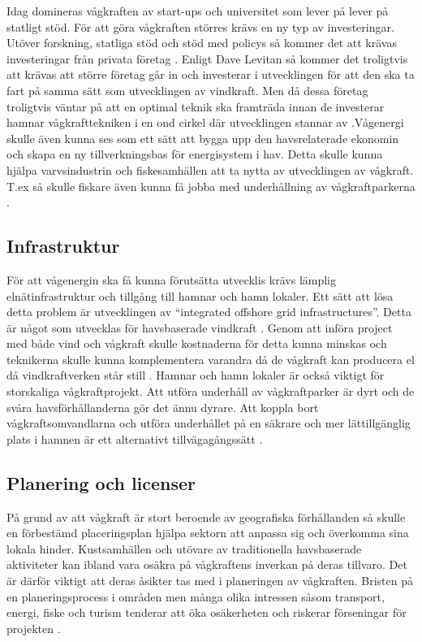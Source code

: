 \documentclass[10pt,a4paper,oneside]{article}
\begin{document}
Idag domineras vågkraften av start-ups och universitet som lever på lever på statligt stöd. För att göra vågkraften störres krävs en ny typ av investeringar. Utöver forskning, statliga stöd och stöd med policys så kommer det att krävas investeringar från privata företag \cite{IRENA}. Enligt Dave Levitan så kommer det troligtvis att krävas att större företag går in och investerar i utvecklingen för att den ska ta fart på samma sätt som utvecklingen av vindkraft. Men då dessa företag troligtvis väntar på att en optimal teknik ska framträda innan de investerar hamnar vågkrafttekniken i en ond cirkel där utvecklingen stannar av \cite{Yale}.Vågenergi skulle även kunna ses som ett sätt att bygga upp den havsrelaterade ekonomin och skapa en ny tillverkningsbas för energisystem i hav. Detta skulle kunna hjälpa varvsindustrin och fiskesamhällen att ta nytta av utvecklingen av vågkraft. T.ex så skulle fiskare även kunna få jobba med underhållning av vågkraftparkerna \cite{IRENA}. 

\subsection{Infrastruktur}
För att vågenergin ska få kunna förutsätta utvecklis krävs lämplig elnätinfrastruktur och tillgång till hamnar och hamn lokaler. Ett sätt att lösa detta problem är utvecklingen av “integrated offshore grid infrastructures”. Detta är något som utvecklas för havsbaserade vindkraft \cite{IRENA}. Genom att införa project med både vind och vågkraft skulle kostnaderna för detta kunna minskas och teknikerna skulle kunna komplementera varandra då de vågkraft kan producera el då vindkraftverken står still \cite{Yale}. Hamnar och hamn lokaler är också viktigt för storskaliga vågkraftprojekt. Att utföra underhåll av vågkraftparker är dyrt och de svåra havsförhållanderna gör det ännu dyrare. Att koppla bort vågkraftsomvandlarna och utföra underhållet på en säkrare och mer lättillgänglig plats i hamnen är ett alternativt tillvägagångssätt \cite{IRENA}. 

\subsection{Planering och licenser}
På grund av att vågkraft är stort beroende av geografiska förhållanden så skulle en förbestämd placeringsplan hjälpa sektorn att anpassa sig och överkomma sina lokala hinder. Kustsamhällen och utövare av traditionella havsbaserade aktiviteter kan ibland vara osäkra på vågkraftens inverkan på deras tillvaro. Det är därför viktigt att deras åsikter tas med i planeringen av vågkraften. Bristen på en planeringsprocess i områden men många olika intressen såsom transport, energi, fiske och turism tenderar att öka osäkerheten och riskerar förseningar för projekten \cite{IRENA}. 
\end{document}
